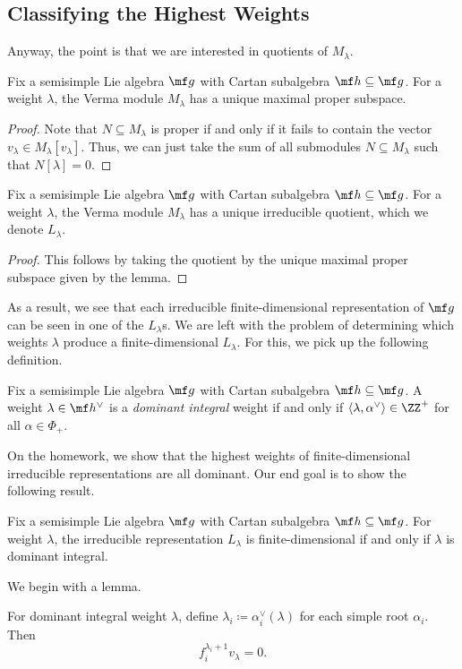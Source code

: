 \documentclass[../notes.tex]{subfiles}
\begin{document}
\subsection{Classifying the Highest Weights}
Anyway, the point is that we are interested in quotients of $M_\lambda$.
\begin{lemma}
	Fix a semisimple Lie algebra $\mf g$ with Cartan subalgebra $\mf h\subseteq\mf g$. For a weight $\lambda$, the Verma module $M_\lambda$ has a unique maximal proper subspace.
\end{lemma}
\begin{proof}
	Note that $N\subseteq M_\lambda$ is proper if and only if it fails to contain the vector $v_\lambda\in M_\lambda[v_\lambda]$. Thus, we can just take the sum of all submodules $N\subseteq M_\lambda$ such that $N[\lambda]=0$.
\end{proof}
\begin{corollary}
	Fix a semisimple Lie algebra $\mf g$ with Cartan subalgebra $\mf h\subseteq\mf g$. For a weight $\lambda$, the Verma module $M_\lambda$ has a unique irreducible quotient, which we denote $L_\lambda$.
\end{corollary}
\begin{proof}
	This follows by taking the quotient by the unique maximal proper subspace given by the lemma.
\end{proof}
As a result, we see that each irreducible finite-dimensional representation of $\mf g$ can be seen in one of the $L_\lambda$s. We are left with the problem of determining which weights $\lambda$ produce a finite-dimensional $L_\lambda$. For this, we pick up the following definition.
\begin{definition}
	Fix a semisimple Lie algebra $\mf g$ with Cartan subalgebra $\mf h\subseteq\mf g$. A weight $\lambda\in\mf h^\lor$ is a \textit{dominant integral} weight if and only if $\langle\lambda,\alpha^\lor\rangle\in\ZZ^+$ for all $\alpha\in\Phi_+$.
\end{definition}
On the homework, we show that the highest weights of finite-dimensional irreducible representations are all dominant. Our end goal is to show the following result.
\begin{theorem}
	Fix a semisimple Lie algebra $\mf g$ with Cartan subalgebra $\mf h\subseteq\mf g$. For weight $\lambda$, the irreducible representation $L_\lambda$ is finite-dimensional if and only if $\lambda$ is dominant integral.
\end{theorem}
We begin with a lemma.
\begin{lemma}
	For dominant integral weight $\lambda$, define $\lambda_i\coloneqq\alpha_i^\lor(\lambda)$ for each simple root $\alpha_i$. Then
	\[f_i^{\lambda_i+1}v_\lambda=0.\]
\end{lemma}
\end{document}
